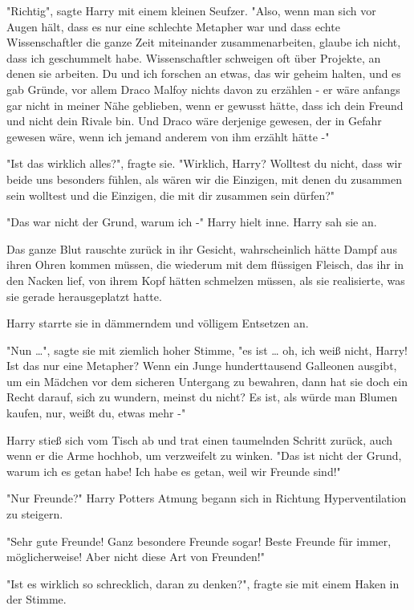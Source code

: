{"Richtig", sagte Harry mit einem kleinen Seufzer. "Also, wenn man sich vor Augen hält, dass es nur eine schlechte Metapher war und dass echte Wissenschaftler die ganze Zeit miteinander zusammenarbeiten, glaube ich nicht, dass ich geschummelt habe. Wissenschaftler schweigen oft über Projekte, an denen sie arbeiten. Du und ich forschen an etwas, das wir geheim halten, und es gab Gründe, vor allem Draco Malfoy nichts davon zu erzählen - er wäre anfangs gar nicht in meiner Nähe geblieben, wenn er gewusst hätte, dass ich dein Freund und nicht dein Rivale bin. Und Draco wäre derjenige gewesen, der in Gefahr gewesen wäre, wenn ich jemand anderem von ihm erzählt hätte -"

"Ist das wirklich alles?", fragte sie. "Wirklich, Harry? Wolltest du nicht, dass wir beide uns besonders fühlen, als wären wir die Einzigen, mit denen du zusammen sein wolltest und die Einzigen, die mit dir zusammen sein dürfen?"

"Das war nicht der Grund, warum ich -" Harry hielt inne. Harry sah sie an.

Das ganze Blut rauschte zurück in ihr Gesicht, wahrscheinlich hätte Dampf aus ihren Ohren kommen müssen, die wiederum mit dem flüssigen Fleisch, das ihr in den Nacken lief, von ihrem Kopf hätten schmelzen müssen, als sie realisierte, was sie gerade herausgeplatzt hatte.

Harry starrte sie in dämmerndem und völligem Entsetzen an.

"Nun …", sagte sie mit ziemlich hoher Stimme, "es ist … oh, ich weiß nicht, Harry! Ist das nur eine Metapher? Wenn ein Junge hunderttausend Galleonen ausgibt, um ein Mädchen vor dem sicheren Untergang zu bewahren, dann hat sie doch ein Recht darauf, sich zu wundern, meinst du nicht? Es ist, als würde man Blumen kaufen, nur, weißt du, etwas mehr -"

Harry stieß sich vom Tisch ab und trat einen taumelnden Schritt zurück, auch wenn er die Arme hochhob, um verzweifelt zu winken. "Das ist nicht der Grund, warum ich es getan habe! Ich habe es getan, weil wir Freunde sind!"

"Nur Freunde?" Harry Potters Atmung begann sich in Richtung Hyperventilation zu steigern.

"Sehr gute Freunde! Ganz besondere Freunde sogar! Beste Freunde für immer, möglicherweise! Aber nicht diese Art von Freunden!"

"Ist es wirklich so schrecklich, daran zu denken?", fragte sie mit einem Haken in der Stimme.

}
